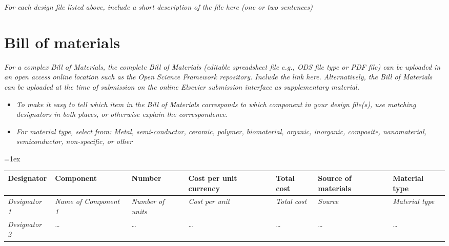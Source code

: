 \documentclass[11pt, letterpaper]{article}
\begin{document}
\textit{For each design file listed above, include a short description of the file here (one or two sentences)}

\section{Bill of materials}


\textit{For a complex Bill of Materials, the complete Bill of Materials (editable spreadsheet file e.g., ODS file type or PDF file) can be uploaded in an open access online location such as the Open Science Framework repository. Include the link here. Alternatively, the Bill of Materials can be uploaded at the time of submission on the online Elsevier submission interface as supplementary material.}
\begin{itemize}
\item \textit{To make it easy to tell which item in the Bill of Materials corresponds to which component in your design file(s), use matching designators in both places, or otherwise explain the correspondence.}
\item \textit{For material type, select from: Metal, semi-conductor, ceramic, polymer, biomaterial, organic, inorganic, composite, nanomaterial, semiconductor, non-specific, or other} 
\end{itemize}

\tabulinesep=1ex
\begin{tabu} to \linewidth {|X|X|X|X|X|X|X|}
\hline
\textbf{Designator} & \textbf{Component} & \textbf{Number} & \textbf{Cost per unit currency} & \textbf{Total cost} & \textbf{Source of materials} & \textbf{Material type} \\\hline

\textit{Designator 1} & \textit{Name of Component 1} & \textit{Number of units} & \textit{Cost per unit} & \textit{Total cost} & \textit{Source} & \textit{Material type} \\\hline
\textit{Designator 2} & \dots & \dots & \dots & \dots & \dots & \dots \\\hline
\end{tabu}
\end{document}
